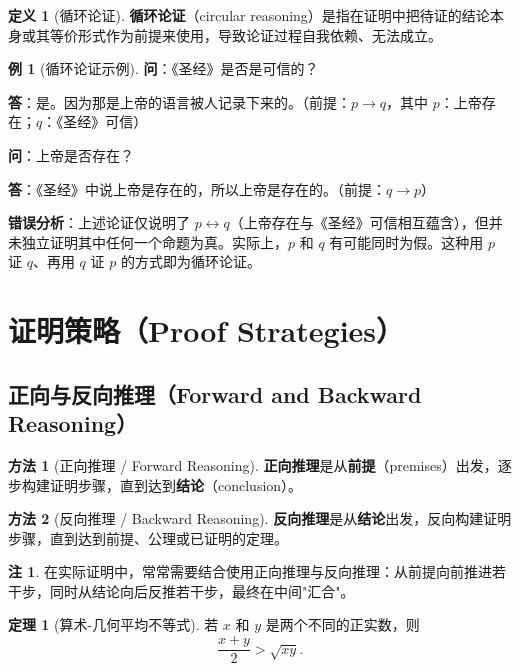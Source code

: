 \documentclass[UTF8,11pt,a4paper]{ctexbook}   %
\theoremstyle{definition}
\newtheorem{definition}{定义}[section]
\newtheorem{theorem}{定理}[section]
\newtheorem{example}{例}[section]
\newtheorem{remark}{注}[section]
\newtheorem{method}{方法}[section]
\begin{document}
\begin{definition}[循环论证]
\textbf{循环论证}（circular reasoning）是指在证明中把待证的结论本身或其等价形式作为前提来使用，导致论证过程自我依赖、无法成立。
\end{definition}

\begin{example}[循环论证示例]
\textbf{问}：《圣经》是否是可信的？

\textbf{答}：是。因为那是上帝的语言被人记录下来的。（前提：$p \to q$，其中 $p$：上帝存在；$q$：《圣经》可信）

\textbf{问}：上帝是否存在？

\textbf{答}：《圣经》中说上帝是存在的，所以上帝是存在的。（前提：$q \to p$）

\textbf{错误分析}：上述论证仅说明了 $p \leftrightarrow q$（上帝存在与《圣经》可信相互蕴含），但并未独立证明其中任何一个命题为真。实际上，$p$ 和 $q$ 有可能同时为假。这种用 $p$ 证 $q$、再用 $q$ 证 $p$ 的方式即为循环论证。
\end{example}

\section{证明策略（Proof Strategies）}

\subsection{正向与反向推理（Forward and Backward Reasoning）}

\begin{method}[正向推理 / Forward Reasoning]
\textbf{正向推理}是从\textbf{前提}（premises）出发，逐步构建证明步骤，直到达到\textbf{结论}（conclusion）。
\end{method}

\begin{method}[反向推理 / Backward Reasoning]
\textbf{反向推理}是从\textbf{结论}出发，反向构建证明步骤，直到达到前提、公理或已证明的定理。
\end{method}

\begin{remark}
在实际证明中，常常需要结合使用正向推理与反向推理：从前提向前推进若干步，同时从结论向后反推若干步，最终在中间"汇合"。
\end{remark}

\begin{theorem}[算术-几何平均不等式]
若 $x$ 和 $y$ 是两个不同的正实数，则
\[
\frac{x+y}{2} > \sqrt{xy}.
\]
\end{theorem}
\end{document}
